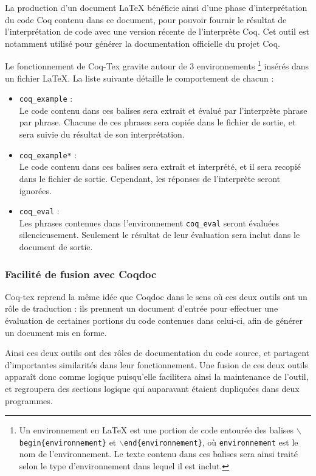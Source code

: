 \documentclass[a4paper, 11pt]{report}
\begin{document}
    La production d'un document LaTeX bénéficie ainsi d'une phase
    d'interprétation du code Coq contenu dans ce document, pour pouvoir fournir
    le résultat de l'interprétation de code avec une version récente de
    l'interprète Coq. Cet outil est notamment utilisé pour générer la documentation
    officielle du projet Coq.

    Le fonctionnement de Coq-Tex gravite autour de 3 environnements \footnote{Un
    environnement en LaTeX est une portion de code entourée des balises
    \texttt{$\backslash$begin\{environnement\}} et
    \texttt{$\backslash$end\{environnement\}}, où \texttt{environnement} est
    le nom de l'environnement. Le texte contenu dans ces balises sera ainsi
    traité selon le type d'environnement dans lequel il est inclut.}
    insérés
    dans un fichier LaTeX. La liste suivante détaille le comportement de
    chacun :
    \begin{itemize}
      \item \texttt{coq\_example} : \\
        Le code contenu dans ces balises sera extrait et évalué par
        l'interprète phrase par phrase. Chacune de ces phrases sera copiée
        dans le fichier de sortie, et sera suivie du résultat de son
        interprétation.
      \item \texttt{coq\_example*} : \\
        Le code contenu dans ces balises sera extrait et interprété, et il
        sera recopié dans le fichier de sortie. Cependant, les réponses de
        l'interprète seront ignorées.
      \item \texttt{coq\_eval} : \\
        Les phrases contenues dans l'environnement \texttt{coq\_eval} seront
        évaluées silencieusement. Seulement le résultat de leur évaluation sera
        inclut dans le document de sortie.
    \end{itemize}

    \subsubsection{Facilité de fusion avec Coqdoc}
    Coq-tex reprend la même idée que Coqdoc dans le sens où ces deux outils
    ont un rôle de traduction : ils prennent un document d'entrée pour effectuer
    une évaluation de certaines portions du code contenues dans celui-ci, afin
    de générer un document mis en forme.

    Ainsi ces deux outils ont des rôles de documentation du code source, et
    partagent d'importantes similarités dans leur fonctionnement. Une fusion
    de ces deux outils apparaît donc comme logique puisqu'elle facilitera
    ainsi la maintenance de l'outil, et regroupera des sections logique qui
    auparavant étaient dupliquées dans deux programmes.
\end{document}
